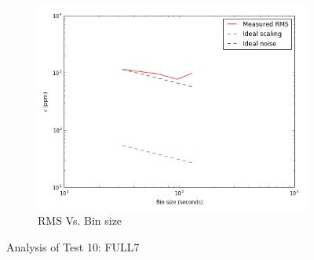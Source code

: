 \documentclass{aastex6}
\begin{document}
\begin{figure}[H]
    \begin{subfigure}{3}
        \includegraphics[scale=0.6]{rms_test10}
        \caption{RMS Vs. Bin size}
    \end{subfigure}
    \caption{Analysis of Test 10: FULL7}
\end{figure}
\end{document}
